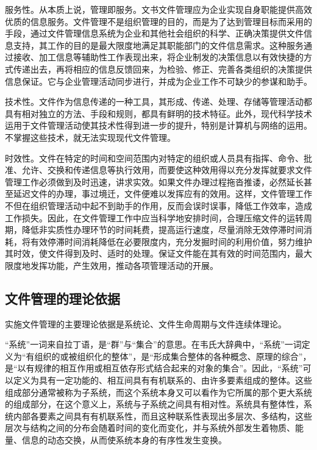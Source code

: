     \begin{enumerate.zh}
        \item 服务性。从本质上说，管理即服务。文书文件管理应为企业实现自身职能提供高效优质的信息服务。文件管理不是组织管理的目的，而是为了达到管理目标而采用的手段，通过文件管理信息系统为企业和其他社会组织的科学、正确决策提供文件信息支持，其工作的目的是最大限度地满足其职能部门的文件信息需求。这种服务通过接收、加工信息等辅助性工作表现出来，将企业制发的决策信息以有效快捷的方式传递出去，再将相应的信息反馈回来，为检验、修正、完善各类组织的决策提供信息保证。它与企业管理活动同步进行，并成为企业工作不可缺少的参谋和助手。

        \item 技术性。文件作为信息传递的一种工具，其形成、传递、处理、存储等管理活动都具有相对独立的方法、手段和规则，都具有鲜明的技术特征。此外，现代科学技术运用于文件管理活动使其技术性得到进一步的提升，特别是计算机与网络的运用。不掌握这些技术，就无法实现现代文件管理。

        \item 时效性。文件在特定的时间和空间范围内对特定的组织或人员具有指挥、命令、批准、允许、交换和传递信息等执行效用，而要使这种效用得以充分发挥就要求文件管理工作必须做到及时迅速，讲求实效。如果文件办理过程拖沓推诿，必然延长甚至延迟文件的办理，事过境迁，文件便难以发挥应有的效用。这样，文件管理工作不但在组织管理活动中起不到助手的作用，反而会误时误事，降低工作效率，造成工作损失。因此，在文件管理工作中应当科学地安排时间，合理压缩文件的运转周期，降低非实质性办理环节的时间耗费，提高运行速度，尽量消除无效停滞时间消耗，将有效停滞时间消耗降低在必要限度内，充分发掘时间的利用价值，努力维护其时效，使文件得到及时、适时的处理。保证文件能在其有效的时间范围内，最大限度地发挥功能，产生效用，推动各项管理活动的开展。
    \end{enumerate.zh}

    \subsection {文件管理的理论依据}

    实施文件管理的主要理论依据是系统论、文件生命周期与文件连续体理论。

    “系统”一词来自拉丁语，是“群”与“集合”的意思。在韦氏大辞典中，“系统”一词定义为“有组织的或被组织化的整体”，是“形成集合整体的各种概念、原理的综合”，是“以有规律的相互作用或相互依存形式结合起来的对象的集合”。因此，“系统”可以定义为具有一定功能的、相互间具有有机联系的、由许多要素组成的整体。这些组成部分通常被称为子系统，而这个系统本身又可以看作为它所属的那个更大系统的组成部分，在这个意义上，系统与子系统之间具有相对性。系统具有整体性，系统内部各要素之间具有有机联系性，而且这种联系性表现出多层次、多结构，这些层次与结构之间的分布会随着时间的变化而变化，并与系统外部发生着物质、能量、信息的动态交换，从而使系统本身的有序性发生变换。

